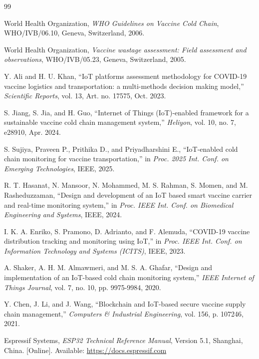 \documentclass[12pt, a4paper]{article}
\begin{document}
\begin{thebibliography}{99}

World Health Organization, \textit{WHO Guidelines on Vaccine Cold Chain}, WHO/IVB/06.10, Geneva, Switzerland, 2006.

World Health Organization, \textit{Vaccine wastage assessment: Field assessment and observations}, WHO/IVB/05.23, Geneva, Switzerland, 2005.

Y. Ali and H. U. Khan, ``IoT platforms assessment methodology for COVID-19 vaccine logistics and transportation: a multi-methods decision making model,'' \textit{Scientific Reports}, vol. 13, Art. no. 17575, Oct. 2023.

S. Jiang, S. Jia, and H. Guo, ``Internet of Things (IoT)-enabled framework for a sustainable vaccine cold chain management system,'' \textit{Heliyon}, vol. 10, no. 7, e28910, Apr. 2024.

S. Sujiya, Praveen P., Prithika D., and Priyadharshini E., ``IoT-enabled cold chain monitoring for vaccine transportation,'' in \textit{Proc. 2025 Int. Conf. on Emerging Technologies}, IEEE, 2025.

R. T. Hasanat, N. Mansoor, N. Mohammed, M. S. Rahman, S. Momen, and M. Rasheduzzaman, ``Design and development of an IoT based smart vaccine carrier and real-time monitoring system,'' in \textit{Proc. IEEE Int. Conf. on Biomedical Engineering and Systems}, IEEE, 2024.

I. K. A. Enriko, S. Pramono, D. Adrianto, and F. Alemuda, ``COVID-19 vaccine distribution tracking and monitoring using IoT,'' in \textit{Proc. IEEE Int. Conf. on Information Technology and Systems (ICITS)}, IEEE, 2023.

A. Shaker, A. H. M. Almawmeri, and M. S. A. Ghafar, ``Design and implementation of an IoT-based cold chain monitoring system,'' \textit{IEEE Internet of Things Journal}, vol. 7, no. 10, pp. 9975-9984, 2020.

Y. Chen, J. Li, and J. Wang, ``Blockchain and IoT-based secure vaccine supply chain management,'' \textit{Computers \& Industrial Engineering}, vol. 156, p. 107246, 2021.

Espressif Systems, \textit{ESP32 Technical Reference Manual}, Version 5.1, Shanghai, China. [Online]. Available: \url{https://docs.espressif.com}


\end{thebibliography}
\end{document}
